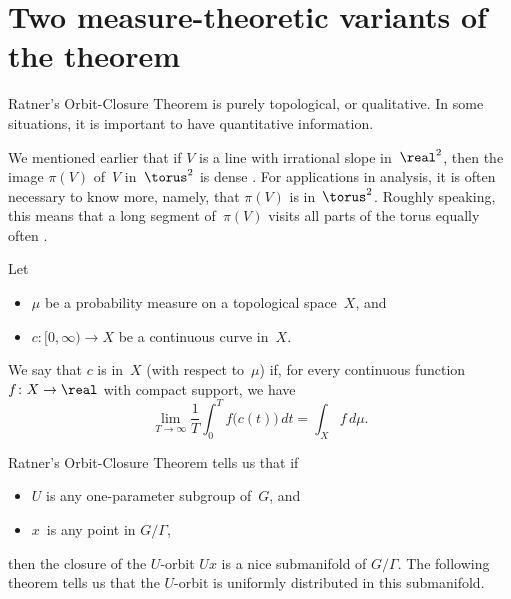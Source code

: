 \section{Two measure-theoretic variants of the theorem} \label{RatnerVariantsSect}

Ratner's Orbit-Closure Theorem  is purely topological, or qualitative. In some situations, it is important to have quantitative information. 

\begin{eg}
We mentioned earlier that if $V$ is a line with irrational slope in~$\real^2$, then the image $\pi(V)$ of~$V$ in~$\torus^2$ is dense . 
For applications in analysis, it is often necessary to know more, namely, that $\pi(V)$ is  in~$\torus^2$. Roughly speaking, this means that a long segment of~$\pi(V)$ visits all parts of the torus equally often . 
\end{eg}

\begin{defn} \label{UnifDistDefn}
Let
	\begin{itemize}
	\item $\mu$ be a probability measure on a topological space~$X$,
	and
	\item $c \colon [0,\infty) \to X$ be a continuous curve in~$X$.
	\end{itemize}
We say that $c$ is  in~$X$ (with respect to~$\mu$) if, for every continuous function $f \colon X \to \real$ with compact support, we have
	$$ \lim_{T \to \infty} \frac{1}{T} \int_0^T f \bigl( c(t) \bigr) \, dt = \int_X f \, d\mu . $$
\end{defn}

Ratner's Orbit-Closure Theorem tells us that if 
	\begin{itemize}
	\item $U$ is any one-parameter subgroup of~$G$, 
	and 
	\item $x$~is any point in $G/\Gamma$, 
	\end{itemize}
then the closure of the $U$-orbit $U x$ is a nice submanifold of $G/\Gamma$. The following theorem tells us that the $U$-orbit is uniformly distributed in this submanifold.


